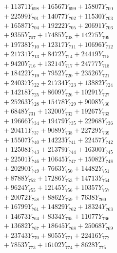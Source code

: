 \documentclass[a4paper,10pt]{article}
\begin{document}
{\begin{align}
&\;  + 11371 Y_{698} + 16567 Y_{699} + 15807 Y_{700} \\[0.3ex]
&\;  + 22599 Y_{701} + 14077 Y_{702} + 11530 Y_{703} \\[0.3ex]
&\;  + 16587 Y_{704} + 19222 Y_{705} + 20691 Y_{706} \\[0.3ex]
&\;  + 9355 Y_{707} + 17485 Y_{708} + 14275 Y_{709} \\[0.3ex]
&\;  + 19738 Y_{710} + 12317 Y_{711} + 10696 Y_{712} \\[0.3ex]
&\;  + 21731 Y_{713} + 8472 Y_{714} + 24419 Y_{715} \\[0.3ex]
&\;  + 9420 Y_{716} + 13214 Y_{717} + 24777 Y_{718} \\[0.5ex]\allowbreak
&\;  + 18422 Y_{719} + 7952 Y_{720} + 23526 Y_{721} \\[0.3ex]
&\;  + 24037 Y_{722} + 21734 Y_{723} + 13882 Y_{724} \\[0.3ex]
&\;  + 14218 Y_{725} + 8609 Y_{726} + 10291 Y_{727} \\[0.3ex]
&\;  + 25263 Y_{728} + 15478 Y_{729} + 9008 Y_{730} \\[0.3ex]
&\;  + 6848 Y_{731} + 13200 Y_{732} + 19267 Y_{733} \\[0.3ex]
&\;  + 19666 Y_{734} + 19479 Y_{735} + 22968 Y_{736} \\[0.3ex]
&\;  + 20411 Y_{737} + 9089 Y_{738} + 22729 Y_{739} \\[0.3ex]
&\;  + 15507 Y_{740} + 14223 Y_{741} + 22457 Y_{742} \\[0.3ex]
&\;  + 12508 Y_{743} + 21379 Y_{744} + 16300 Y_{745} \\[0.3ex]
&\;  + 22501 Y_{746} + 10645 Y_{747} + 15082 Y_{748} \\[0.5ex]\allowbreak
&\;  + 20290 Y_{749} + 7663 Y_{750} + 14482 Y_{751} \\[0.3ex]
&\;  + 8788 Y_{752} + 17286 Y_{753} + 14713 Y_{754} \\[0.3ex]
&\;  + 9624 Y_{755} + 12145 Y_{756} + 10357 Y_{757} \\[0.3ex]
&\;  + 20072 Y_{758} + 8862 Y_{759} + 7638 Y_{760} \\[0.3ex]
&\;  + 16799 Y_{761} + 14829 Y_{762} + 18324 Y_{763} \\[0.3ex]
&\;  + 14673 Y_{764} + 8334 Y_{765} + 11077 Y_{766} \\[0.3ex]
&\;  + 13682 Y_{767} + 18645 Y_{768} + 25068 Y_{769} \\[0.3ex]
&\;  + 23743 Y_{770} + 8055 Y_{771} + 22416 Y_{772} \\[0.3ex]
&\;  + 7853 Y_{773} + 16102 Y_{774} + 8628 Y_{775} \\[0.3ex]

\end{align}}
\end{document}
